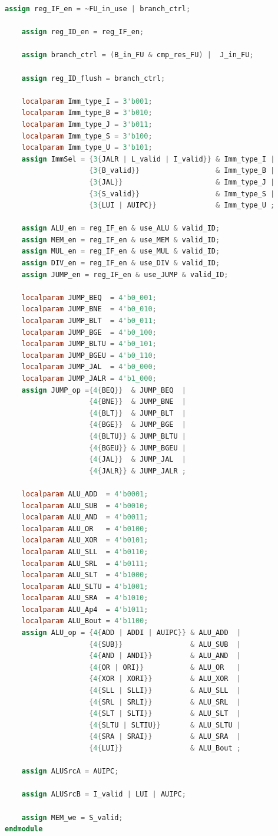\begin{lstlisting}[language=Verilog]
	assign reg_IF_en = ~FU_in_use | branch_ctrl;

	assign reg_ID_en = reg_IF_en;

	assign branch_ctrl = (B_in_FU & cmp_res_FU) |  J_in_FU;

	assign reg_ID_flush = branch_ctrl;

	localparam Imm_type_I = 3'b001;
	localparam Imm_type_B = 3'b010;
	localparam Imm_type_J = 3'b011;
	localparam Imm_type_S = 3'b100;
	localparam Imm_type_U = 3'b101;
	assign ImmSel = {3{JALR | L_valid | I_valid}} & Imm_type_I |
					{3{B_valid}}                  & Imm_type_B |
					{3{JAL}}                      & Imm_type_J |
					{3{S_valid}}                  & Imm_type_S |
					{3{LUI | AUIPC}}              & Imm_type_U ;
	
	assign ALU_en = reg_IF_en & use_ALU & valid_ID;
	assign MEM_en = reg_IF_en & use_MEM & valid_ID;
	assign MUL_en = reg_IF_en & use_MUL & valid_ID;
	assign DIV_en = reg_IF_en & use_DIV & valid_ID;
	assign JUMP_en = reg_IF_en & use_JUMP & valid_ID;

	localparam JUMP_BEQ  = 4'b0_001;
	localparam JUMP_BNE  = 4'b0_010;
	localparam JUMP_BLT  = 4'b0_011;
	localparam JUMP_BGE  = 4'b0_100;
	localparam JUMP_BLTU = 4'b0_101;
	localparam JUMP_BGEU = 4'b0_110;
	localparam JUMP_JAL  = 4'b0_000;
	localparam JUMP_JALR = 4'b1_000;
	assign JUMP_op ={4{BEQ}}  & JUMP_BEQ  |
					{4{BNE}}  & JUMP_BNE  |
					{4{BLT}}  & JUMP_BLT  |
					{4{BGE}}  & JUMP_BGE  |
					{4{BLTU}} & JUMP_BLTU |
					{4{BGEU}} & JUMP_BGEU |
					{4{JAL}}  & JUMP_JAL  |
					{4{JALR}} & JUMP_JALR ;
	
	localparam ALU_ADD  = 4'b0001;
	localparam ALU_SUB  = 4'b0010;
	localparam ALU_AND  = 4'b0011;
	localparam ALU_OR   = 4'b0100;
	localparam ALU_XOR  = 4'b0101;
	localparam ALU_SLL  = 4'b0110;
	localparam ALU_SRL  = 4'b0111;
	localparam ALU_SLT  = 4'b1000;
	localparam ALU_SLTU = 4'b1001;
	localparam ALU_SRA  = 4'b1010;
	localparam ALU_Ap4  = 4'b1011;
	localparam ALU_Bout = 4'b1100;
	assign ALU_op = {4{ADD | ADDI | AUIPC}} & ALU_ADD  |
					{4{SUB}}                & ALU_SUB  |
					{4{AND | ANDI}}         & ALU_AND  |
					{4{OR | ORI}}           & ALU_OR   |
					{4{XOR | XORI}}         & ALU_XOR  |
					{4{SLL | SLLI}}         & ALU_SLL  |
					{4{SRL | SRLI}}         & ALU_SRL  |
					{4{SLT | SLTI}}         & ALU_SLT  |
					{4{SLTU | SLTIU}}       & ALU_SLTU |
					{4{SRA | SRAI}}         & ALU_SRA  |
					{4{LUI}}                & ALU_Bout ;

	assign ALUSrcA = AUIPC;

	assign ALUSrcB = I_valid | LUI | AUIPC;

	assign MEM_we = S_valid;
endmodule
\end{lstlisting}

